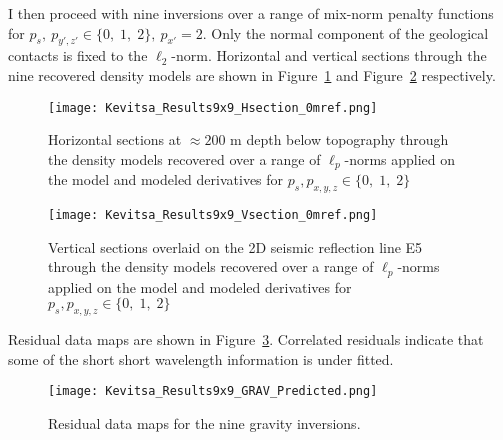 I then proceed with nine inversions over a range of mix-norm penalty functions for $p_s,\:p_{y',z'} \in \{0,\; 1,\; 2\},\: p_{x'}=2$. Only the normal component of the geological contacts is fixed to the $\ell_2$-norm.
Horizontal and vertical sections through the nine recovered density models are shown in Figure~\ref{Kevitsa_Hsection} and Figure~\ref{Kevitsa_Vsections} respectively.
\begin{figure}
\texttt{[image: Kevitsa\_Results9x9\_Hsection\_0mref.png]}
\caption{Horizontal sections at $\approx 200$ m depth below topography through the density models recovered over a range of $\ell_p$-norms applied on the model and modeled derivatives for $p_s,p_{x,y,z} \in \{0,\; 1,\; 2\}$}
\label{Kevitsa_Hsection}
\end{figure}
\begin{figure}
\texttt{[image: Kevitsa\_Results9x9\_Vsection\_0mref.png]}
\caption{Vertical sections overlaid on the 2D seismic reflection line E5 through the density models recovered over a range of $\ell_p$-norms applied on the model and modeled derivatives for $p_s,p_{x,y,z} \in \{0,\; 1,\; 2\}$}
\label{Kevitsa_Vsections}
\end{figure}
Residual data maps are shown in Figure~\ref{Kevitsa_Results9x9_GRAV_Predicted}. Correlated residuals indicate that some of the short short wavelength information is under fitted.
\begin{figure}
\texttt{[image: Kevitsa\_Results9x9\_GRAV\_Predicted.png]}
\caption{Residual data maps for the nine gravity inversions.}
\label{Kevitsa_Results9x9_GRAV_Predicted}
\end{figure}

